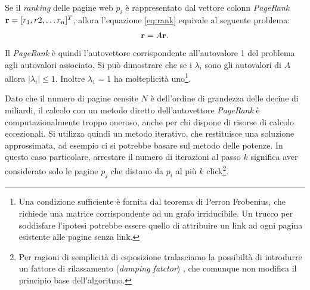 Se il \emph{ranking} delle pagine web $p_i$ \`e rappresentato dal vettore colonn
\emph{PageRank} $\mathbf{r}=[r_1,r2, \dots r_n]^T$, allora l'equazione \eqref{eq:rank}
equivale al seguente problema:
\begin{align*}
    \mathbf{r}=A \mathbf{r}.
\end{align*}
Il \emph{PageRank} \`e quindi l'autovettore corrispondente all'autovalore 1 del problema
agli autovalori associato. Si pu\`o dimostrare che se i $\lambda_i$ sono gli autovalori
di $A$ allora $|\lambda_i| \leq 1$. Inoltre $\lambda_1=1$ ha molteplicit\`a
uno\footnote{Una condizione sufficiente \`e fornita dal teorema di Perron Frobenius,
che richiede una matrice corrispondente ad un grafo irriducibile. Un trucco per
soddisfare l'ipotesi potrebbe essere quello di attribuire un link ad ogni pagina
esistente alle pagine senza link.}.

Dato che il numero di pagine censite $N$ \`e dell'ordine di grandezza delle decine di
miliardi, il calcolo con un metodo diretto dell'autovettore \emph{PageRank} \`e
computazionalmente troppo oneroso, anche per chi dispone di risorse di calcolo eccezionali.
Si utilizza quindi un metodo iterativo, che restituisce una soluzione approssimata,
ad esempio ci si potrebbe basare sul metodo delle potenze. In questo caso particolare,
arrestare il numero di iterazioni al passo $k$ significa aver considerato solo le pagine
$p_j$ che distano da $p_i$ al pi\`u $k$ click\footnote{Per ragioni di semplicit\`a di
esposizione tralasciamo la possibilt\`a di introdurre un fattore di rilassamento
(\emph{damping fatctor}) \cite{Brin1998}, che comunque non modifica il principio base
dell'algoritmo.}.
